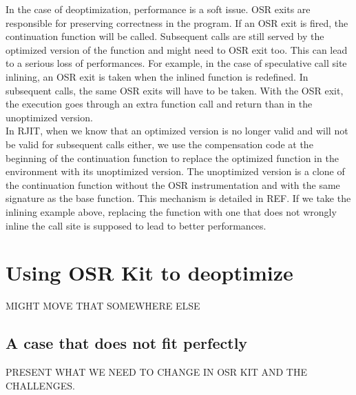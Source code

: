 In the case of deoptimization, performance is a soft issue.
OSR exits are responsible for preserving correctness in the program. 
If an OSR exit is fired, the continuation function will be called.
Subsequent calls are still served by the optimized version of the function and might need to OSR exit too.
This can lead to a serious loss of performances.
For example, in the case of speculative call site inlining, an OSR exit is taken when the inlined function is redefined.
In subsequent calls, the same OSR exits will have to be taken.
With the OSR exit, the execution goes through an extra function call and return than in the unoptimized version.\\

In RJIT, when we know that an optimized version is no longer valid and will not be valid for subsequent calls either, we use the compensation code at the beginning of the continuation function to replace the optimized function in the environment with its unoptimized version.
The unoptimized version is a clone of the continuation function without the OSR instrumentation and with the same signature as the base function.
This mechanism is detailed in REF.
If we take the inlining example above, replacing the function with one that does not wrongly inline the call site is supposed to lead to better performances.\\


\section{Using OSR Kit to deoptimize}\label{osrForUs}
MIGHT MOVE THAT SOMEWHERE ELSE\\
\subsection{A case that does not fit perfectly}
PRESENT WHAT WE NEED TO CHANGE IN OSR KIT AND THE CHALLENGES.\\


